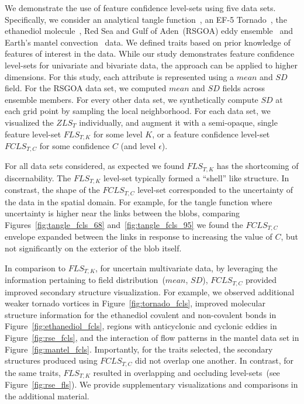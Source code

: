 We demonstrate the use of feature confidence level-sets using five data sets.
%
Specifically, we consider an analytical tangle function~\cite{knoll2009fast}, an EF-5 Tornado~\cite{atmos10100578}, the ethanediol molecule~\cite{}, Red Sea and Gulf of Aden~(RSGOA) eddy ensemble~\cite{sanikommu2020impact} and Earth's mantel convection~\cite{shahnas2017mid} data.
%
We defined traits based on prior knowledge of features of interest in the data.
%
While our study demonstrates feature confidence level-sets for univariate and bivariate data, the approach can be applied to higher dimensions.
%
For this study, each attribute is represented using a $mean$ and $SD$ field. 
%
For the RSGOA data set, we computed $mean$ and $SD$ fields across ensemble members. 
%
For every other data set, we synthetically compute $SD$ at each grid point by sampling the local neighborhood.
%
For each data set, we visualized the $ZLS_{T}$ individually, and augment it with a semi-opaque, single feature level-set $FLS_{T,K}$ for some level $K$, or a feature confidence level-set $FCLS_{T,C}$ for some confidence $C$ (and level $\epsilon$).
%

For all data sets considered, as expected we found $FLS_{T,K}$ has the shortcoming of discernability.
%
The $FLS_{T,K}$ level-set typically formed a ``shell'' like structure.
%
In constrast, the shape of the $FCLS_{T,C}$ level-set corresponded to the uncertainty of the data in the spatial domain.
%
For example, for the tangle function where uncertainty is higher near the links between the blobs, comparing Figures~\ref{fig:tangle_fcls_68} and~\ref{fig:tangle_fcls_95} we found the $FCLS_{T,C}$ envelope expanded between the links in response to increasing the value of $C$, but not significantly on the exterior of the blob itself.

In comparison to $FLS_{T,K}$, for uncertain multivariate data, by leveraging the information pertaining to field distribution~($mean$, $SD$), $FCLS_{T,C}$ provided improved secondary structure visualization.
%
For example, we observed additional weaker tornado vortices in Figure~\ref{fig:tornado_fcls}, improved molecular structure information for the ethanediol covalent and non-covalent bonds in Figure~\ref{fig:ethanediol_fcls}, regions with anticyclonic and cyclonic eddies in Figure~\ref{fig:rse_fcls}, and the interaction of flow patterns in the mantel data set in Figure~\ref{fig:mantel_fcls}.
%
Importantly, for the traits selected, the secondary structures produced using $FCLS_{T,C}$ did not overlap one another.
%
In contrast, for the same traits, $FLS_{T,K}$ resulted in overlapping and occluding level-sets~(see Figure~\ref{fig:rse_fls}).
%
We provide supplementary visualizations and comparisons in the additional material. 
 





